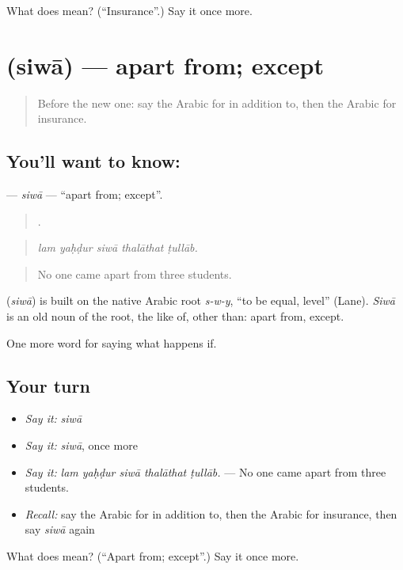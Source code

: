\begin{tcolorbox}[breakable,colback=teal!4,colframe=teal!35!black,title={Before you move on}]
What does  mean? (\textquotedblleft{}Insurance\textquotedblright{}.) Say it once more.
\end{tcolorbox}
\section[\texorpdfstring{\ar{سوى} (siwā)}{سوى (siwā)}]{ (siwā) — apart from; except}

\label{lesson:AR-C416-siwa}



\begin{quote}
Before the new one: say the Arabic for in addition to, then the Arabic for insurance.
\end{quote}

\subsection*{You'll want to know: }
\textbf{} — \emph{siwā} — \textquotedblleft{}apart from; except\textquotedblright{}.

\begin{quote}
    .
\end{quote}

\begin{quote}
\emph{lam yaḥḍur siwā thalāthat ṭullāb.}
\end{quote}

\begin{quote}
No one came apart from three students.
\end{quote}

\begin{cousinweb}
\textbf{} (\emph{siwā}) is built on the native Arabic root \emph{s-w-y}, \textquotedblleft{}to be equal, level\textquotedblright{} (Lane). \emph{Siwā} is an old noun of the root, the like of, other than: apart from, except.
\end{cousinweb}

\begin{grammarlens}[title={What you've built}]
One more word for saying what happens if.
\end{grammarlens}

\subsection*{Your turn}
\begin{itemize}
\raggedright
  \item \emph{Say it:} \emph{siwā}
  \item \emph{Say it:} \emph{siwā}, once more
  \item \emph{Say it:} \emph{lam yaḥḍur siwā thalāthat ṭullāb.} — No one came apart from three students.
  \item \emph{Recall:} say the Arabic for in addition to, then the Arabic for insurance, then say \emph{siwā} again
\end{itemize}

\begin{tcolorbox}[breakable,colback=teal!4,colframe=teal!35!black,title={Before you move on}]
What does  mean? (\textquotedblleft{}Apart from; except\textquotedblright{}.) Say it once more.
\end{tcolorbox}
